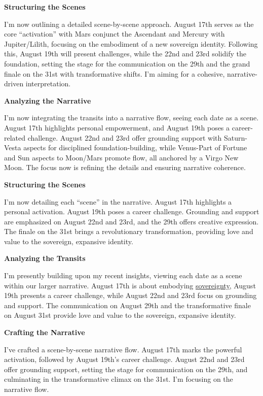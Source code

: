 \documentclass{article}
\begin{document}
\textbf{Structuring the Scenes}

I'm now outlining a detailed scene-by-scene approach. August 17th serves as the core ``activation'' with Mars conjunct the Ascendant and Mercury with Jupiter/Lilith, focusing on the embodiment of a new sovereign identity. Following this, August 19th will present challenges, while the 22nd and 23rd solidify the foundation, setting the stage for the communication on the 29th and the grand finale on the 31st with transformative shifts. I'm aiming for a cohesive, narrative-driven interpretation.

\textbf{Analyzing the Narrative}

I'm now integrating the transits into a narrative flow, seeing each date as a scene. August 17th highlights personal empowerment, and August 19th poses a career-related challenge. August 22nd and 23rd offer grounding support with Saturn-Vesta aspects for disciplined foundation-building, while Venus-Part of Fortune and Sun aspects to Moon/Mars promote flow, all anchored by a Virgo New Moon. The focus now is refining the details and ensuring narrative coherence.

\textbf{Structuring the Scenes}

I'm now detailing each ``scene'' in the narrative. August 17th highlights a personal activation. August 19th poses a career challenge. Grounding and support are emphasized on August 22nd and 23rd, and the 29th offers creative expression. The finale on the 31st brings a revolutionary transformation, providing love and value to the sovereign, expansive identity.

\textbf{Analyzing the Transits}

I'm presently building upon my recent insights, viewing each date as a scene within our larger narrative. August 17th is about embodying \hyperlink{gloss:sovereignty}{sovereignty}, August 19th presents a career challenge, while August 22nd and 23rd focus on grounding and support. The communication on August 29th and the transformative finale on August 31st provide love and value to the sovereign, expansive identity.

\textbf{Crafting the Narrative}

I've crafted a scene-by-scene narrative flow. August 17th marks the powerful activation, followed by August 19th's career challenge. August 22nd and 23rd offer grounding support, setting the stage for communication on the 29th, and culminating in the transformative climax on the 31st. I'm focusing on the narrative flow.
\end{document}
